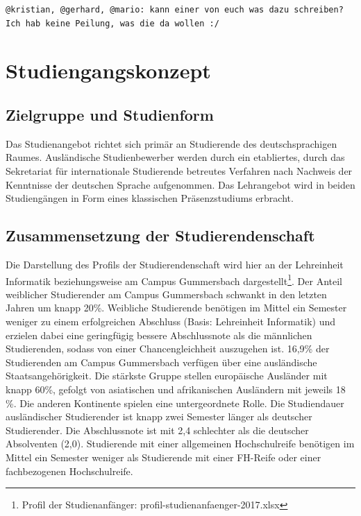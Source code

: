 \begin{verbatim}
@kristian, @gerhard, @mario: kann einer von euch was dazu schreiben? Ich hab keine Peilung, was die da wollen :/
\end{verbatim}

\chapter{Studiengangskonzept}\label{studiengangskonzept}

\section{Zielgruppe und
Studienform}\label{zielgruppe-und-studienform}

Das Studienangebot richtet sich primär an Studierende des
deutschsprachigen Raumes. Ausländische Studienbewerber werden durch ein
etabliertes, durch das Sekretariat für internationale Studierende
betreutes Verfahren nach Nachweis der Kenntnisse der deutschen Sprache
aufgenommen. Das Lehrangebot wird in beiden Studiengängen in Form eines
klassischen Präsenzstudiums erbracht.

\section{Zusammensetzung der
Studierendenschaft}\label{zusammensetzung-der-studierendenschaft}

Die Darstellung des Profils der Studierendenschaft wird hier an der
Lehreinheit Informatik beziehungsweise am Campus Gummersbach
dargestellt\footnote{Profil der Studienanfänger:
  profil-studienanfaenger-2017.xlsx}. Der Anteil weiblicher Studierender
am Campus Gummersbach schwankt in den letzten Jahren um knapp 20\%.
Weibliche Studierende benötigen im Mittel ein Semester weniger zu einem
erfolgreichen Abschluss (Basis: Lehreinheit Informatik) und erzielen
dabei eine geringfügig bessere Abschlussnote als die männlichen
Studierenden, sodass von einer Chancengleichheit auszugehen ist. 16,9\%
der Studierenden am Campus Gummersbach verfügen über eine ausländische
Staatsangehörigkeit. Die stärkste Gruppe stellen europäische Ausländer
mit knapp 60\%, gefolgt von asiatischen und afrikanischen Ausländern mit
jeweils 18 \%. Die anderen Kontinente spielen eine untergeordnete Rolle.
Die Studiendauer ausländischer Studierender ist knapp zwei Semester
länger als deutscher Studierender. Die Abschlussnote ist mit 2,4
schlechter als die deutscher Absolventen (2,0). Studierende mit einer
allgemeinen Hochschulreife benötigen im Mittel ein Semester weniger als
Studierende mit einer FH-Reife oder einer fachbezogenen Hochschulreife.

